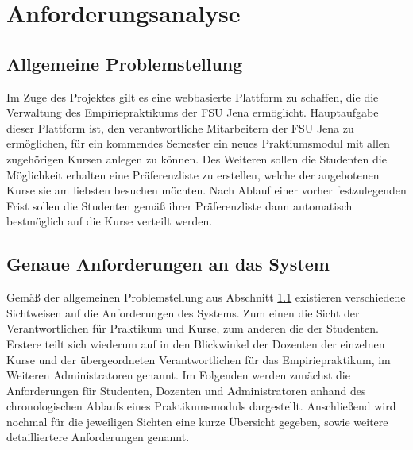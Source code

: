 \chapter{Anforderungsanalyse}
    \section{Allgemeine Problemstellung}
    \label{Problemstellung}
        Im Zuge des Projektes gilt es eine webbasierte Plattform zu schaffen, die die Verwaltung des Empiriepraktikums der FSU Jena ermöglicht.
        Hauptaufgabe dieser Plattform ist, den verantwortliche Mitarbeitern der FSU Jena zu ermöglichen, für ein kommendes Semester ein neues Praktiumsmodul mit allen zugehörigen Kursen anlegen zu können.
        Des Weiteren sollen die Studenten die Möglichkeit erhalten eine Präferenzliste zu erstellen, welche der angebotenen Kurse sie am liebsten besuchen möchten.
        Nach Ablauf einer vorher festzulegenden Frist sollen die Studenten gemäß ihrer Präferenzliste dann automatisch bestmöglich auf die Kurse verteilt werden.     
    
    \section{Genaue Anforderungen an das System}
        Gemäß der allgemeinen Problemstellung aus Abschnitt \ref{Problemstellung} existieren verschiedene Sichtweisen auf die Anforderungen des Systems.
        Zum einen die Sicht der Verantwortlichen für Praktikum und Kurse, zum anderen die der Studenten.
        Erstere teilt sich wiederum auf in den Blickwinkel der Dozenten der einzelnen Kurse und der übergeordneten Verantwortlichen für das Empiriepraktikum, im Weiteren Administratoren genannt.
        Im Folgenden werden zunächst die Anforderungen für Studenten, Dozenten und Administratoren anhand des chronologischen Ablaufs eines Praktikumsmoduls dargestellt.
        Anschließend wird nochmal für die jeweiligen Sichten eine kurze Übersicht gegeben, sowie weitere detailliertere Anforderungen genannt.
        
